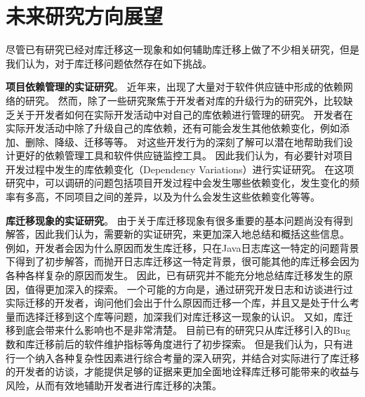 \documentclass[UTF8]{ctexart}
\begin{document}



\section{未来研究方向展望}
\label{section:future-work}


尽管已有研究已经对库迁移这一现象和如何辅助库迁移上做了不少相关研究，但是我们认为，对于库迁移问题依然存在如下挑战。

\textbf{项目依赖管理的实证研究}。
近年来，出现了大量对于软件供应链中形成的依赖网络的研究\cite{2019MSR-Dietrich-DependencyVersioning, 2019MSR-Valero-DiversityMaven, 2019TSE-Decan-Semantic, 2017MSR-Kikas-Structure}。
然而，除了一些研究聚焦于开发者对库的升级行为\cite{2018EMSE-Kula-Do, 2018ICSME-Zapata-Towards}的研究外，比较缺乏关于开发者如何在实际开发活动中对自己的库依赖进行管理的研究。
开发者在实际开发活动中除了升级自己的库依赖，还有可能会发生其他依赖变化，例如添加、删除、降级、迁移等等。
对这些开发行为的深刻了解可以潜在地帮助我们设计更好的依赖管理工具和软件供应链监控工具。
因此我们认为，有必要针对项目开发过程中发生的库依赖变化（Dependency Variations）进行实证研究。
在这项研究中，可以调研的问题包括项目开发过程中会发生哪些依赖变化，发生变化的频率有多高，不同项目之间的差异，以及为什么会发生这些依赖变化等等。

\textbf{库迁移现象的实证研究}。
由于关于库迁移现象有很多重要的基本问题尚没有得到解答，因此我们认为，需要新的实证研究，来更加深入地总结和概括这些信息。
例如，开发者会因为什么原因而发生库迁移，只在Java日志库这一特定的问题背景下得到了初步解答\cite{2016MSR-Kabinna-Logging}，而抛开日志库迁移这一特定背景，很可能其他的库迁移会因为各种各样复杂的原因而发生。
因此，已有研究并不能充分地总结库迁移发生的原因，值得更加深入的探索。
一个可能的方向是，通过研究开发日志和访谈进行过实际迁移的开发者，询问他们会出于什么原因而迁移一个库，并且又是处于什么考量而选择迁移到这个库等问题，加深我们对库迁移这一现象的认识。
又如，库迁移到底会带来什么影响也不是非常清楚。
目前已有的研究只从库迁移引入的Bug数\cite{2016MSR-Kabinna-Logging}和库迁移前后的软件维护指标\cite{2019Arxiv-Alrubaye-How}等角度进行了初步探索。
但是我们认为，只有进行一个纳入各种复杂性因素进行综合考量的深入研究，并结合对实际进行了库迁移的开发者的访谈，才能提供足够的证据来更加全面地诠释库迁移可能带来的收益与风险，从而有效地辅助开发者进行库迁移的决策。
\end{document}
